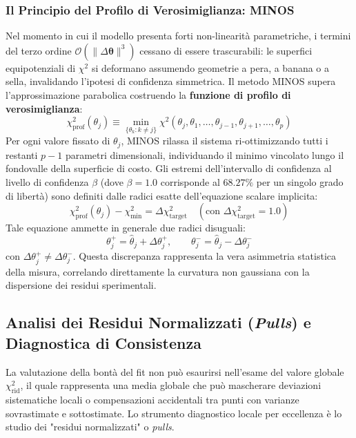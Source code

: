\documentclass[11pt,a4paper]{article}
\begin{document}
\subsubsection{Il Principio del Profilo di Verosimiglianza: MINOS}
Nel momento in cui il modello presenta forti non-linearità parametriche, i termini del terzo ordine $\mathcal{O}(\|\Delta \boldsymbol{\theta}\|^3)$ cessano di essere trascurabili: le superfici equipotenziali di $\chi^2$ si deformano assumendo geometrie a pera, a banana o a sella, invalidando l'ipotesi di confidenza simmetrica.
Il metodo MINOS supera l'approssimazione parabolica costruendo la \textbf{funzione di profilo di verosimiglianza}:
\begin{equation}
    \chi^2_{\text{prof}}(\theta_j) \equiv \min_{\{\theta_k : k \neq j\}} \chi^2(\theta_j, \theta_1, \dots, \theta_{j-1}, \theta_{j+1}, \dots, \theta_p)
\end{equation}
Per ogni valore fissato di $\theta_j$, MINOS rilassa il sistema ri-ottimizzando tutti i restanti $p-1$ parametri dimensionali, individuando il minimo vincolato lungo il fondovalle della superficie di costo.
Gli estremi dell'intervallo di confidenza al livello di confidenza $\beta$ (dove $\beta = 1.0$ corrisponde al $68.27\%$ per un singolo grado di libertà) sono definiti dalle radici esatte dell'equazione scalare implicita:
\begin{equation}
    \chi^2_{\text{prof}}(\theta_j) - \chi^2_{\text{min}} = \Delta \chi^2_{\text{target}} \quad (\text{con } \Delta \chi^2_{\text{target}} = 1.0)
\end{equation}
Tale equazione ammette in generale due radici disuguali:
\begin{equation}
    \theta_j^+ = \hat{\theta}_j + \Delta \theta_j^+, \qquad \theta_j^- = \hat{\theta}_j - \Delta \theta_j^-
\end{equation}
con $\Delta \theta_j^+ \neq \Delta \theta_j^-$. Questa discrepanza rappresenta la vera asimmetria statistica della misura, correlando direttamente la curvatura non gaussiana con la dispersione dei residui sperimentali.

\subsection{Analisi dei Residui Normalizzati (\emph{Pulls}) e Diagnostica di Consistenza}

La valutazione della bontà del fit non può esaurirsi nell'esame del valore globale $\chi^2_{\text{rid}}$, il quale rappresenta una media globale che può mascherare deviazioni sistematiche locali o compensazioni accidentali tra punti con varianze sovrastimate e sottostimate.
Lo strumento diagnostico locale per eccellenza è lo studio dei "residui normalizzati" o \emph{pulls}.
\end{document}

